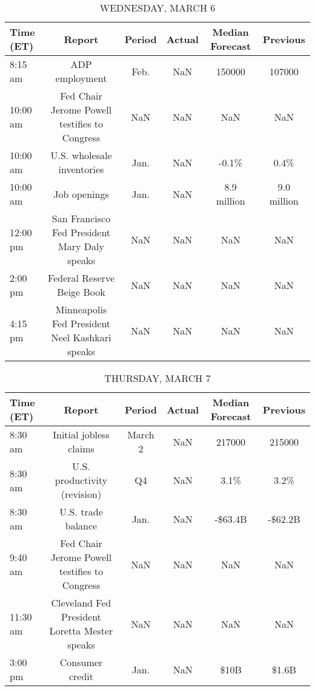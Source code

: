 \documentclass{article}%
\begin{document}
\begin{table}[htbp]%
\caption{WEDNESDAY, MARCH 6}%
\centering%
\begin{adjustbox}{width=1\textwidth}%
\begin{tabular}{lccccc}
\toprule
Time (ET) &                                         Report & Period & Actual & Median Forecast &    Previous \\
\midrule
  8:15 am &                                 ADP employment &   Feb. &    NaN &          150000 &      107000 \\
 10:00 am &  Fed Chair Jerome Powell testifies to Congress &    NaN &    NaN &             NaN &         NaN \\
 10:00 am &                     U.S. wholesale inventories &   Jan. &    NaN &           -0.1\% &        0.4\% \\
 10:00 am &                                   Job openings &   Jan. &    NaN &     8.9 million & 9.0 million \\
 12:00 pm &   San Francisco Fed President Mary Daly speaks &    NaN &    NaN &             NaN &         NaN \\
  2:00 pm &                     Federal Reserve Beige Book &    NaN &    NaN &             NaN &         NaN \\
  4:15 pm & Minneapolis Fed President Neel Kashkari speaks &    NaN &    NaN &             NaN &         NaN \\
\bottomrule
\end{tabular}
%
\end{adjustbox}%
\end{table}

%


\begin{table}[htbp]%
\caption{THURSDAY, MARCH 7}%
\centering%
\begin{adjustbox}{width=1\textwidth}%
\begin{tabular}{lccccc}
\toprule
Time (ET) &                                        Report &  Period & Actual & Median Forecast & Previous \\
\midrule
  8:30 am &                        Initial jobless claims & March 2 &    NaN &          217000 &   215000 \\
  8:30 am &                  U.S. productivity (revision) &      Q4 &    NaN &            3.1\% &     3.2\% \\
  8:30 am &                            U.S. trade balance &    Jan. &    NaN &         -\$63.4B &  -\$62.2B \\
  9:40 am & Fed Chair Jerome Powell testifies to Congress &     NaN &    NaN &             NaN &      NaN \\
 11:30 am & Cleveland Fed President Loretta Mester speaks &     NaN &    NaN &             NaN &      NaN \\
  3:00 pm &                               Consumer credit &    Jan. &    NaN &            \$10B &    \$1.6B \\
\bottomrule
\end{tabular}
%
\end{adjustbox}%
\end{table}
\end{document}
